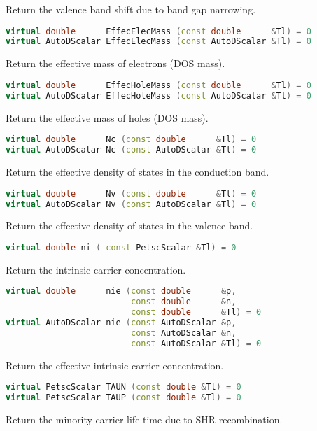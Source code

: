 \documentclass[oneside,12pt]{cgd_book}
\begin{document}
Return the valence band shift due to band gap narrowing.
\par
\begin{lstlisting}[language={C++}]
virtual double      EffecElecMass (const double      &Tl) = 0
virtual AutoDScalar EffecElecMass (const AutoDScalar &Tl) = 0
\end{lstlisting}
Return the effective mass of electrons (DOS mass).
\par
\begin{lstlisting}[language={C++}]
virtual double      EffecHoleMass (const double      &Tl) = 0
virtual AutoDScalar EffecHoleMass (const AutoDScalar &Tl) = 0
\end{lstlisting}
Return the effective mass of holes (DOS mass).
\par
\begin{lstlisting}[language={C++}]
virtual double      Nc (const double      &Tl) = 0
virtual AutoDScalar Nc (const AutoDScalar &Tl) = 0
\end{lstlisting}
Return the effective density of states in the conduction band.
\par
\begin{lstlisting}[language={C++}]
virtual double      Nv (const double      &Tl) = 0
virtual AutoDScalar Nv (const AutoDScalar &Tl) = 0
\end{lstlisting}
Return the effective density of states in the valence band.
\par
\begin{lstlisting}[language={C++}]
virtual double ni ( const PetscScalar &Tl) = 0
\end{lstlisting}
Return the intrinsic carrier concentration.
\par
\begin{lstlisting}[language={C++}]
virtual double      nie (const double      &p,
                         const double      &n,
                         const double      &Tl) = 0
virtual AutoDScalar nie (const AutoDScalar &p,
                         const AutoDScalar &n,
                         const AutoDScalar &Tl) = 0
\end{lstlisting}
Return the effective intrinsic carrier concentration.
\par
\begin{lstlisting}[language={C++}]
virtual PetscScalar TAUN (const double &Tl) = 0
virtual PetscScalar TAUP (const double &Tl) = 0
\end{lstlisting}
Return the minority carrier life time due to SHR recombination.
\par
\end{document}
